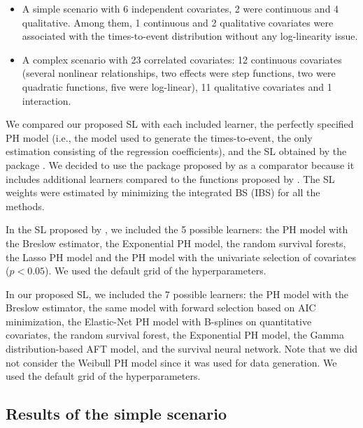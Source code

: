 \begin{itemize}
\item
  A simple scenario with 6 independent covariates, 2 were continuous and 4 qualitative. Among them, 1 continuous and 2 qualitative covariates were associated with the times-to-event distribution without any log-linearity issue.
\item
  A complex scenario with 23 correlated covariates: 12 continuous covariates (several nonlinear relationships, two effects were step functions, two were quadratic functions, five were log-linear), 11 qualitative covariates and 1 interaction.
\end{itemize}

We compared our proposed SL with each included learner, the perfectly specified PH model (i.e., the model used to generate the times-to-event, the only estimation consisting of the regression coefficients), and the SL obtained by the  package \citep{westlingPkgsurvSuperLearnerSuperLearning2021}. We decided to use the package proposed by \citet{westlingPkgsurvSuperLearnerSuperLearning2021} as a comparator because it includes additional learners compared to the functions proposed by \citet{golmakaniSuperLearnerSurvival2020a}. The SL weights were estimated by minimizing the integrated BS (IBS) for all the methods.

In the SL proposed by \citet{westlingPkgsurvSuperLearnerSuperLearning2021}, we included the 5 possible learners: the PH model with the Breslow estimator, the Exponential PH model, the random survival forests, the Lasso PH model and the PH model with the univariate selection of covariates (\(p<0.05\)). We used the default grid of the hyperparameters.

In our proposed SL, we included the 7 possible learners: the PH model with the Breslow estimator, the same model with forward selection based on AIC minimization, the Elastic-Net PH model with B-splines on quantitative covariates, the random survival forest, the Exponential PH model, the Gamma distribution-based AFT model, and the survival neural network. Note that we did not consider the Weibull PH model since it was used for data generation. We used the default grid of the hyperparameters.

\hypertarget{results-of-the-simple-scenario}{%
\subsection{Results of the simple scenario}\label{results-of-the-simple-scenario}}

